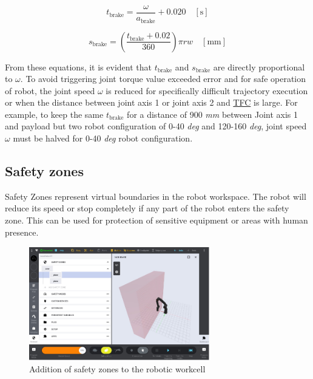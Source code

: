     \begin{equation}
        t_{\text{brake}} = \frac{\omega}{a_{\text{brake}}} + 0.020 \quad [\text{s}]
        \label{eq:t-brake}
    \end{equation}
        
    \begin{equation}
        s_{\text{brake}} = \left(\frac{t_{\text{brake}} + 0.02}{360}\right) \pi r w \quad [\text{mm}]
        \label{eq:s-brake}
    \end{equation}

    From these equations, it is evident that \hyperref[sym:t-brake]{$t_{\text{brake}}$} and \hyperref[sym:s-brake]{$s_{\text{brake}}$} are directly proportional to \hyperref[sym:omega]{$\omega$}.
    To avoid triggering joint torque value exceeded error and for safe operation of robot, the joint speed \hyperref[sym:omega]{$\omega$} is reduced for specifically difficult trajectory execution or when the distance
    between joint axis 1 or joint axis 2 and \hyperref[acro:TFC]{TFC} is large. For example, to keep the same \hyperref[sym:t-brake]{$t_{\text{brake}}$} for a distance of 900 \textit{mm} between Joint axis 1 and payload
    but two robot configuration of 0-40 \textit{deg} and 120-160 \textit{deg}, joint speed \hyperref[sym:omega]{$\omega$} must be halved
    for 0-40 \textit{deg} robot configuration.

\subsection{Safety zones}
\label{subsec:safety-zones}

Safety Zones represent virtual boundaries in the robot workspace. The robot will reduce its speed or stop
completely if any part of the robot enters the safety zone. This can be used for protection of sensitive
equipment or areas with human presence. \cite[page 96]{kassow-software-manual}


\begin{figure}[h]
    \centering
    \includegraphics[width=0.7\textwidth]{figures/safety-zones.png}
    \caption{Addition of safety zones to the robotic workcell}
    \label{fig:safety-zones}
\end{figure}


